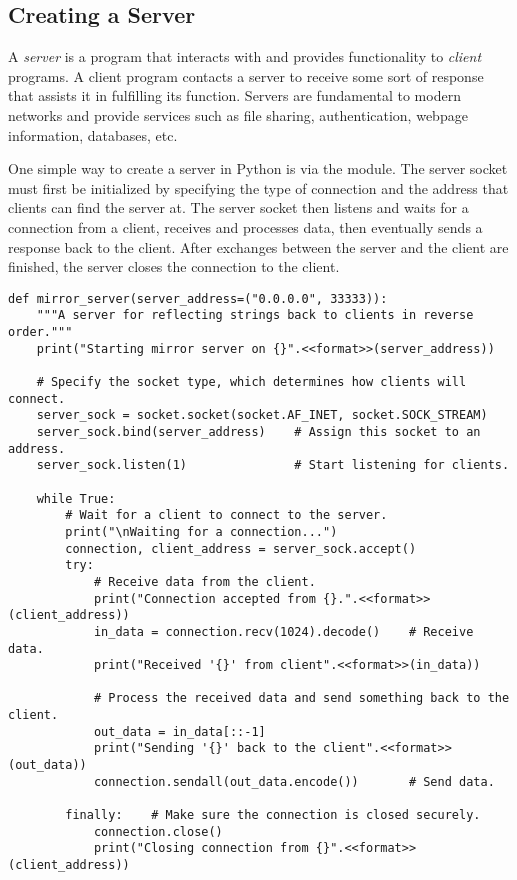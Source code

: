 \subsection*{Creating a Server} %

A \emph{server} is a program that interacts with and provides functionality to \emph{client} programs.
A client program contacts a server to receive some sort of response that assists it in fulfilling its function.
Servers are fundamental to modern networks and provide services such as file sharing, authentication, webpage information, databases, etc.

One simple way to create a server in Python is via the  module.
The server socket must first be initialized by specifying the type of connection and the address that clients can find the server at.
The server socket then listens and waits for a connection from a client, receives and processes data, then eventually sends a response back to the client.
After exchanges between the server and the client are finished, the server closes the connection to the client.

\begin{lstlisting}
def mirror_server(server_address=("0.0.0.0", 33333)):
    """A server for reflecting strings back to clients in reverse order."""
    print("Starting mirror server on {}".<<format>>(server_address))

    # Specify the socket type, which determines how clients will connect.
    server_sock = socket.socket(socket.AF_INET, socket.SOCK_STREAM)
    server_sock.bind(server_address)    # Assign this socket to an address.
    server_sock.listen(1)               # Start listening for clients.

    while True:
        # Wait for a client to connect to the server.
        print("\nWaiting for a connection...")
        connection, client_address = server_sock.accept()
        try:
            # Receive data from the client.
            print("Connection accepted from {}.".<<format>>(client_address))
            in_data = connection.recv(1024).decode()    # Receive data.
            print("Received '{}' from client".<<format>>(in_data))

            # Process the received data and send something back to the client.
            out_data = in_data[::-1]
            print("Sending '{}' back to the client".<<format>>(out_data))
            connection.sendall(out_data.encode())       # Send data.

        finally:    # Make sure the connection is closed securely.
            connection.close()
            print("Closing connection from {}".<<format>>(client_address))
\end{lstlisting}


